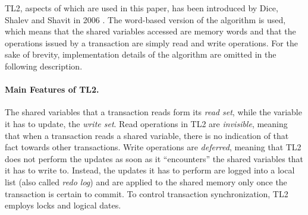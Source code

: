 \documentclass[runningheads,a4paper]{llncs}
\begin{document}
TL2, aspects of which are used in this paper, has been introduced by Dice, Shalev and Shavit in 2006 \cite{dice06}.
The word-based version of the algorithm is used, which means that the shared variables accessed are memory 
words and that the operations issued by a transaction are simply read and write operations. 
For the sake of brevity, implementation details of the algorithm are omitted in the following description. 

\paragraph{Main Features of TL2.} The shared variables  that a  transaction reads form its {\it read
set}, while the variable it has to update, the {\it write set}. 
Read operations in TL2 are {\it invisible},  meaning  that when  a  transaction reads  a  shared 
variable,  there is  no indication of that fact towards  other transactions.  Write operations are  
{\it deferred}, meaning that  TL2 does not perform the updates  as soon as  it {}``encounters'' 
the shared  variables that  it has to write to. Instead, the 
updates it has to perform are logged into a local list (also called {\it redo log}) and   are  applied 
to the shared  memory only once the transaction is certain  to commit.
To control transaction synchronization, TL2 employs locks and 
logical dates. 


\end{document}
